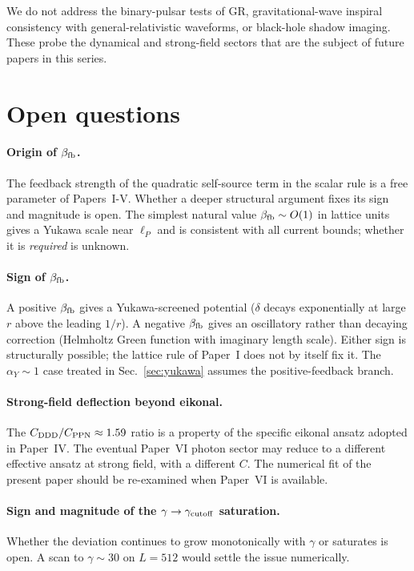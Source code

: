\documentclass[11pt,a4paper]{article}
\begin{document}
We do not address the binary-pulsar tests of GR, gravitational-wave
inspiral consistency with general-relativistic waveforms, or
black-hole shadow imaging. These probe the dynamical and strong-field
sectors that are the subject of future papers in this series.

\section{Open questions}
\label{sec:open}

\paragraph{Origin of $\beta_{\rm fb}$.} The feedback strength of the
quadratic self-source term in the scalar rule is a free parameter of
Papers~I-V. Whether a deeper structural argument fixes its sign and
magnitude is open. The simplest natural value
$\beta_{\rm fb} \sim O(1)$ in lattice units gives a Yukawa scale near
$\ell_P$ and is consistent with all current bounds; whether it is
\emph{required} is unknown.

\paragraph{Sign of $\beta_{\rm fb}$.} A positive $\beta_{\rm fb}$
gives a Yukawa-screened potential ($\delta$ decays exponentially at
large $r$ above the leading $1/r$). A negative $\beta_{\rm fb}$ gives
an oscillatory rather than decaying correction (Helmholtz Green
function with imaginary length scale). Either sign is structurally
possible; the lattice rule of Paper~I does not by itself fix it. The
$\alpha_Y \sim 1$ case treated in Sec.~\ref{sec:yukawa} assumes the
positive-feedback branch.

\paragraph{Strong-field deflection beyond eikonal.} The
$C_{\rm DDD}/C_{\rm PPN} \approx 1.59$ ratio is a property of the
specific eikonal ansatz adopted in Paper~IV. The eventual Paper~VI
photon sector may reduce to a different effective ansatz at strong
field, with a different $C$. The numerical fit of the present paper
should be re-examined when Paper~VI is available.

\paragraph{Sign and magnitude of the $\gamma \to \gamma_{\rm cutoff}$
saturation.} Whether the deviation continues to grow monotonically
with $\gamma$ or saturates is open. A scan to
$\gamma \sim 30$ on $L = 512$ would settle the issue numerically.
\end{document}
